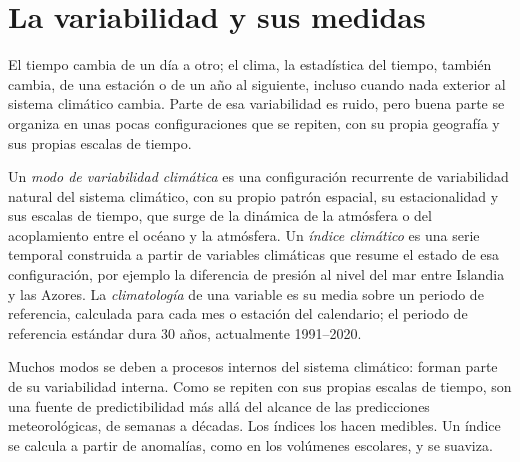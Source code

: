 \section{La variabilidad y sus medidas}\label{sec:b2:climate-variability:measures}

El tiempo cambia de un día a otro; el clima, la estadística del tiempo, también cambia, de una estación
o de un año al siguiente, incluso cuando nada exterior al sistema climático cambia. Parte de esa
variabilidad es ruido, pero buena parte se organiza en unas pocas configuraciones que se repiten, con su propia
geografía y sus propias escalas de tiempo.

\begin{definition}\label{def:b2:climate-variability:modes}
Un \emph{modo de variabilidad climática} es una configuración recurrente de
variabilidad natural del sistema climático, con su propio patrón espacial, su estacionalidad y sus escalas
de tiempo, que surge de la dinámica de la atmósfera o del acoplamiento entre el océano y la
atmósfera. Un \emph{índice climático} es una serie temporal construida a partir de variables
climáticas que resume el estado de esa configuración, por ejemplo la diferencia de presión al nivel del mar
entre Islandia y las Azores. La \emph{climatología} de una variable
es su media sobre un periodo de referencia, calculada para cada mes o estación del calendario; el periodo de referencia
estándar dura 30 años, actualmente 1991--2020.
\end{definition}

Muchos modos se deben a procesos internos del sistema climático: forman parte de su
variabilidad interna. Como se repiten con sus propias escalas de tiempo, son una fuente de
predictibilidad más allá del alcance de las predicciones meteorológicas, de semanas a décadas. Los índices los hacen
medibles. Un índice se calcula a partir de anomalías, como en los volúmenes escolares, y se
suaviza.

